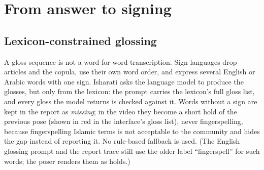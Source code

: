 \chapter{From answer to signing}
\label{sec:production}

\section{Lexicon-constrained glossing}
\label{sec:glossing}
A gloss sequence is not a word-for-word transcription. Sign languages drop articles and the copula, use their own word
order, and express several English or Arabic words with one sign. Isharati asks the language model to produce the
glosses, but only from the lexicon: the prompt carries the lexicon's full gloss list, and every gloss the model returns is
checked against it. Words without a sign are kept in the report as \emph{missing}; in the video they become a short hold
of the previous pose (shown in red in the interface's gloss list), never fingerspelling, because fingerspelling Islamic terms is not
acceptable to the community and hides the gap instead of reporting it. No rule-based fallback is used. (The English glossing prompt and the report trace still use the older label
``fingerspell'' for such words; the poser renders them as holds.)

